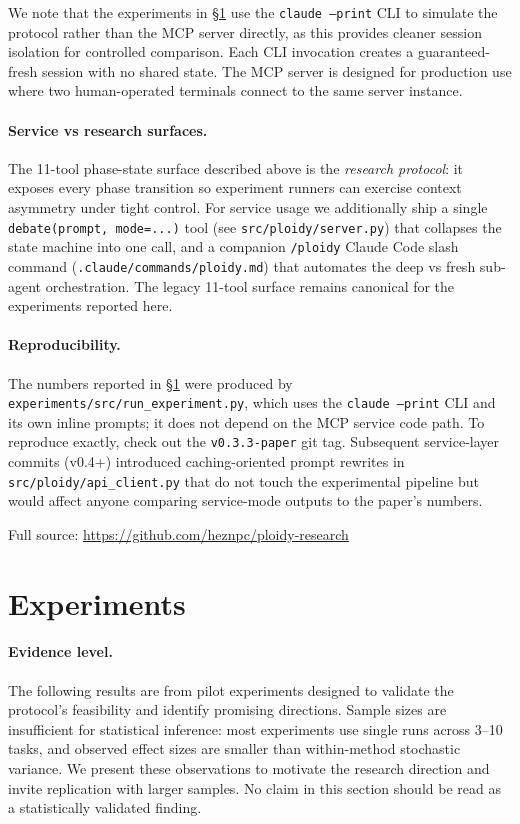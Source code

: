 \documentclass[11pt]{article}
\begin{document}
We note that the experiments in \S\ref{sec:experiments} use the \texttt{claude --print} CLI to simulate the protocol rather than the MCP server directly, as this provides cleaner session isolation for controlled comparison. Each CLI invocation creates a guaranteed-fresh session with no shared state. The MCP server is designed for production use where two human-operated terminals connect to the same server instance.

\paragraph{Service vs research surfaces.} The 11-tool phase-state surface described above is the \emph{research protocol}: it exposes every phase transition so experiment runners can exercise context asymmetry under tight control. For service usage we additionally ship a single \texttt{debate(prompt, mode=...)} tool (see \texttt{src/ploidy/server.py}) that collapses the state machine into one call, and a companion \texttt{/ploidy} Claude Code slash command (\texttt{.claude/commands/ploidy.md}) that automates the deep vs fresh sub-agent orchestration. The legacy 11-tool surface remains canonical for the experiments reported here.

\paragraph{Reproducibility.} The numbers reported in \S\ref{sec:experiments} were produced by \texttt{experiments/src/run\_experiment.py}, which uses the \texttt{claude --print} CLI and its own inline prompts; it does not depend on the MCP service code path. To reproduce exactly, check out the \texttt{v0.3.3-paper} git tag. Subsequent service-layer commits (v0.4+) introduced caching-oriented prompt rewrites in \texttt{src/ploidy/api\_client.py} that do not touch the experimental pipeline but would affect anyone comparing service-mode outputs to the paper's numbers.

Full source: \url{https://github.com/heznpc/ploidy-research}

\section{Experiments}
\label{sec:experiments}

\paragraph{Evidence level.} The following results are from pilot experiments designed to validate the protocol's feasibility and identify promising directions. Sample sizes are insufficient for statistical inference: most experiments use single runs across 3--10 tasks, and observed effect sizes are smaller than within-method stochastic variance. We present these observations to motivate the research direction and invite replication with larger samples. No claim in this section should be read as a statistically validated finding.
\end{document}
